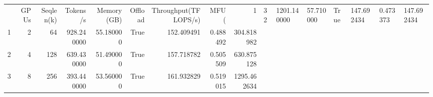 \begin{tabular}{lrrrrrrrr}
\toprule
 & GPUs & Seqlen(k) & Tokens/s & Memory (GB) & Offload & Throughput(TFLOPS/s) & MFU (%
 & 1 & 32 & 1201.140000 & 57.710000 & True & 147.692434 & 0.473373 & 147.692434 \\
1 & 2 & 64 & 928.240000 & 55.180000 & True & 152.409491 & 0.488492 & 304.818982 \\
2 & 4 & 128 & 639.430000 & 51.490000 & True & 157.718782 & 0.505509 & 630.875128 \\
3 & 8 & 256 & 393.440000 & 53.560000 & True & 161.932829 & 0.519015 & 1295.462634 \\
\bottomrule
\end{tabular}
